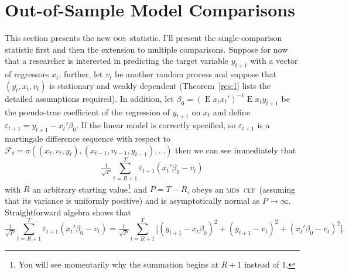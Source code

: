 \documentclass[12pt,fleqn]{article}
\theoremstyle{definition}
\DeclareMathOperator{\E}{E}
\newcommand{\clt}{\textsc{clt}}
\newcommand{\mds}{\textsc{mds}}
\newcommand{\oos}{\textsc{oos}}
\begin{document}
\section{Out-of-Sample Model Comparisons}\label{sec:1}
This section presents the new \oos\ statistic.  I'll present the
single-comparison statistic first and then the extension to multiple
comparisons.  Suppose for now that a researcher is interested in
predicting the target variable $y_{t+1}$ with a vector of regressors
$x_t$; further, let $v_t$ be another random process and suppose that
$(y_t, x_t, v_t)$ is stationary and weakly dependent
(Theorem~\ref{res:1} lists the detailed assumptions required).  In
addition, let $\beta_0 = (\E x_t x_t')^{-1} \E x_t y_{t+1}$ be the
pseudo-true coefficient of the regression of $y_{t+1}$ on $x_t$ and
define $\varepsilon_{t+1} = y_{t+1} - x_t'\beta_0$.  If the linear
model is correctly specified, so $\varepsilon_{t+1}$ is a martingale
difference sequence with respect to $\mathcal{F}_t = \sigma((x_t, v_t,
y_t), (x_{t-1}, v_{t-1}, y_{t-1}),\dots)$ then we can see immediately that
\begin{equation}
  \label{eq:4}
  \tfrac{1}{\sqrt{P}} \sum_{t=R+1}^T \varepsilon_{t+1} (x_t'\beta_0
  - v_t) 
\end{equation}
with $R$ an arbitrary starting value\footnote{You will see momentarily
  why the summation begins at $R+1$ instead of $1$.} and $P = T - R$,
obeys an \mds\ \clt\ (assuming that its variance is uniformly
positive) and is asymptotically normal as $P \to \infty$.
Straightforward algebra \citep{ClW:07} shows that
\begin{equation}
  \label{eq:5}
  \tfrac{1}{\sqrt{P}} \sum_{t=R+1}^T \varepsilon_{t+1} (x_t'\beta_0
  - v_t) = \tfrac{1}{\sqrt{P}} \sum_{t=R+1}^T \Big[(y_{t+1} -
  x_t\beta_0)^2 + (y_{t+1} - v_t)^2 + (x_t'\beta_0 - v_t)^2 \Big].
\end{equation}
\end{document}
